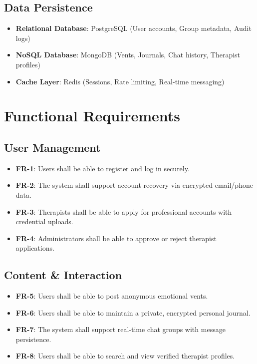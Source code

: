 \documentclass[11pt,a4paper]{article}
\begin{document}
\subsection{Data Persistence}
\begin{itemize}
    \item \textbf{Relational Database}: PostgreSQL (User accounts, Group metadata, Audit logs)
    \item \textbf{NoSQL Database}: MongoDB (Vents, Journals, Chat history, Therapist profiles)
    \item \textbf{Cache Layer}: Redis (Sessions, Rate limiting, Real-time messaging)
\end{itemize}

\section{Functional Requirements}

\subsection{User Management}
\begin{itemize}
    \item \textbf{FR-1}: Users shall be able to register and log in securely.
    \item \textbf{FR-2}: The system shall support account recovery via encrypted email/phone data.
    \item \textbf{FR-3}: Therapists shall be able to apply for professional accounts with credential uploads.
    \item \textbf{FR-4}: Administrators shall be able to approve or reject therapist applications.
\end{itemize}

\subsection{Content \& Interaction}
\begin{itemize}
    \item \textbf{FR-5}: Users shall be able to post anonymous emotional vents.
    \item \textbf{FR-6}: Users shall be able to maintain a private, encrypted personal journal.
    \item \textbf{FR-7}: The system shall support real-time chat groups with message persistence.
    \item \textbf{FR-8}: Users shall be able to search and view verified therapist profiles.
\end{itemize}
\end{document}
